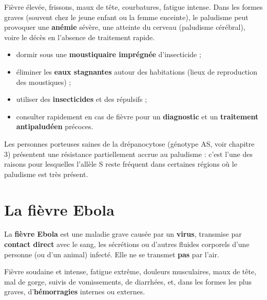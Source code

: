 \begin{propriete}[Symptômes]
Fièvre élevée, frissons, maux de tête, courbatures, fatigue intense. Dans les formes
graves (souvent chez le jeune enfant ou la femme enceinte), le paludisme peut
provoquer une \textbf{anémie} sévère, une atteinte du cerveau (paludisme cérébral),
voire le décès en l'absence de traitement rapide.
\end{propriete}

\begin{propriete}
\begin{itemize}
\item dormir sous une \textbf{moustiquaire imprégnée} d'insecticide ;
\item éliminer les \textbf{eaux stagnantes} autour des habitations (lieux de
reproduction des moustiques) ;
\item utiliser des \textbf{insecticides} et des répulsifs ;
\item consulter rapidement en cas de fièvre pour un \textbf{diagnostic} et un
\textbf{traitement antipaludéen} précoces.
\end{itemize}
\end{propriete}

\begin{remarque}
Les personnes porteuses saines de la drépanocytose (génotype AS, voir chapitre 3)
présentent une résistance partiellement accrue au paludisme : c'est l'une des raisons
pour lesquelles l'allèle S reste fréquent dans certaines régions où le paludisme est
très présent.
\end{remarque}

\section{La fièvre Ebola}

\begin{definition}
La \textbf{fièvre Ebola} est une maladie grave causée par un \textbf{virus},
transmise par \textbf{contact direct} avec le sang, les sécrétions ou d'autres
fluides corporels d'une personne (ou d'un animal) infecté. Elle ne se transmet
\textbf{pas} par l'air.
\end{definition}

\begin{propriete}[Symptômes]
Fièvre soudaine et intense, fatigue extrême, douleurs musculaires, maux de tête, mal
de gorge, suivis de vomissements, de diarrhées, et, dans les formes les plus graves,
d'\textbf{hémorragies} internes ou externes.
\end{propriete}

